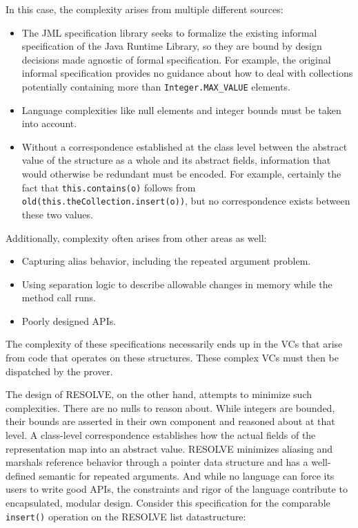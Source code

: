 

In this case, the complexity arises from multiple different sources:

\begin{itemize}
	\item The JML specification library seeks to formalize the existing informal specification of the Java Runtime Library, so they are bound by design decisions made agnostic of formal specification.  For example, the original informal specification provides no guidance about how to deal with collections potentially containing more than \texttt{Integer.MAX\_VALUE} elements.
	\item Language complexities like null elements and integer bounds must be taken into account.
	\item Without a correspondence established at the class level between the abstract value of the structure as a whole and its abstract fields, information that would otherwise be redundant must be encoded.  For example, certainly the fact that \texttt{this.contains(o)} follows from \texttt{\\old(this.theCollection.insert(o))}, but no correspondence exists between these two values.
\end{itemize}

Additionally, complexity often arises from other areas as well:

\begin{itemize}
	\item Capturing alias behavior, including the repeated argument problem.
	\item Using separation logic to describe allowable changes in memory while the method call runs.
	\item Poorly designed APIs.
\end{itemize}

The complexity of these specifications necessarily ends up in the VCs that arise from code that operates on these structures.  These complex VCs must then be dispatched by the prover.

The design of RESOLVE, on the other hand, attempts to minimize such complexities.  There are no nulls to reason about.  While integers are bounded, their bounds are asserted in their own component and reasoned about at that level.  A class-level correspondence establishes how the actual fields of the representation map into an abstract value.  RESOLVE minimizes aliasing and marshals reference behavior through a pointer data structure and has a well-defined semantic for repeated arguments.  And while no language can force its users to write good APIs, the constraints and rigor of the language contribute to encapsulated, modular design.  Consider this specification for the comparable \texttt{insert()} operation on the RESOLVE list datastructure:

